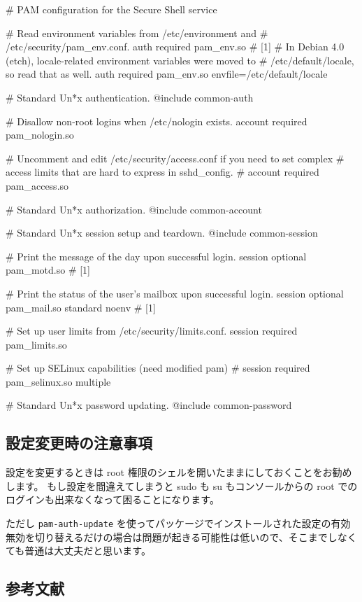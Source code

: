 \documentclass[mingoth,a4paper]{jsarticle}
\begin{document}
\begin{commandline}
# PAM configuration for the Secure Shell service

# Read environment variables from /etc/environment and
# /etc/security/pam_env.conf.
auth       required     pam_env.so # [1]
# In Debian 4.0 (etch), locale-related environment variables were moved to
# /etc/default/locale, so read that as well.
auth       required     pam_env.so envfile=/etc/default/locale

# Standard Un*x authentication.
@include common-auth

# Disallow non-root logins when /etc/nologin exists.
account    required     pam_nologin.so

# Uncomment and edit /etc/security/access.conf if you need to set complex
# access limits that are hard to express in sshd_config.
# account  required     pam_access.so

# Standard Un*x authorization.
@include common-account

# Standard Un*x session setup and teardown.
@include common-session

# Print the message of the day upon successful login.
session    optional     pam_motd.so # [1]

# Print the status of the user's mailbox upon successful login.
session    optional     pam_mail.so standard noenv # [1]

# Set up user limits from /etc/security/limits.conf.
session    required     pam_limits.so

# Set up SELinux capabilities (need modified pam)
# session  required     pam_selinux.so multiple

# Standard Un*x password updating.
@include common-password
\end{commandline}
\subsection{設定変更時の注意事項}
\label{sec-1-7}

設定を変更するときは root 権限のシェルを開いたままにしておくことをお勧めします。
もし設定を間違えてしまうと sudo も su もコンソールからの root でのログインも出来なくなって困ることになります。

ただし \verb~pam-auth-update~ を使ってパッケージでインストールされた設定の有効無効を切り替えるだけの場合は問題が起きる可能性は低いので、そこまでしなくても普通は大丈夫だと思います。
\subsection{参考文献}
\label{sec-1-8}
\end{document}

